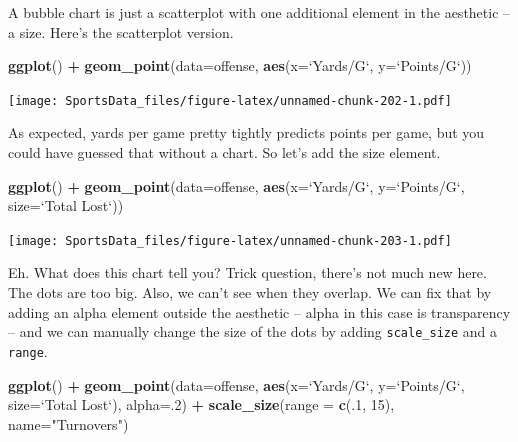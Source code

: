 \documentclass[]{book}
\newenvironment{Shaded}{\begin{snugshade}}{\end{snugshade}}
\newcommand{\DataTypeTok}[1]{\textcolor[rgb]{0.13,0.29,0.53}{#1}}
\newcommand{\DecValTok}[1]{\textcolor[rgb]{0.00,0.00,0.81}{#1}}
\newcommand{\KeywordTok}[1]{\textcolor[rgb]{0.13,0.29,0.53}{\textbf{#1}}}
\newcommand{\NormalTok}[1]{#1}
\newcommand{\OperatorTok}[1]{\textcolor[rgb]{0.81,0.36,0.00}{\textbf{#1}}}
\newcommand{\StringTok}[1]{\textcolor[rgb]{0.31,0.60,0.02}{#1}}
\begin{document}
A bubble chart is just a scatterplot with one additional element in the aesthetic -- a size. Here's the scatterplot version.

\begin{Shaded}
\begin{Highlighting}[]
\KeywordTok{ggplot}\NormalTok{() }\OperatorTok{+}\StringTok{ }\KeywordTok{geom_point}\NormalTok{(}\DataTypeTok{data=}\NormalTok{offense, }\KeywordTok{aes}\NormalTok{(}\DataTypeTok{x=}\StringTok{`}\DataTypeTok{Yards/G}\StringTok{`}\NormalTok{, }\DataTypeTok{y=}\StringTok{`}\DataTypeTok{Points/G}\StringTok{`}\NormalTok{))}
\end{Highlighting}
\end{Shaded}

\texttt{[image: SportsData\_files/figure-latex/unnamed-chunk-202-1.pdf]}

As expected, yards per game pretty tightly predicts points per game, but you could have guessed that without a chart. So let's add the size element.

\begin{Shaded}
\begin{Highlighting}[]
\KeywordTok{ggplot}\NormalTok{() }\OperatorTok{+}\StringTok{ }\KeywordTok{geom_point}\NormalTok{(}\DataTypeTok{data=}\NormalTok{offense, }\KeywordTok{aes}\NormalTok{(}\DataTypeTok{x=}\StringTok{`}\DataTypeTok{Yards/G}\StringTok{`}\NormalTok{, }\DataTypeTok{y=}\StringTok{`}\DataTypeTok{Points/G}\StringTok{`}\NormalTok{, }\DataTypeTok{size=}\StringTok{`}\DataTypeTok{Total Lost}\StringTok{`}\NormalTok{)) }
\end{Highlighting}
\end{Shaded}

\texttt{[image: SportsData\_files/figure-latex/unnamed-chunk-203-1.pdf]}

Eh. What does this chart tell you? Trick question, there's not much new here. The dots are too big. Also, we can't see when they overlap. We can fix that by adding an alpha element outside the aesthetic -- alpha in this case is transparency -- and we can manually change the size of the dots by adding \texttt{scale\_size} and a \texttt{range}.

\begin{Shaded}
\begin{Highlighting}[]
\KeywordTok{ggplot}\NormalTok{() }\OperatorTok{+}\StringTok{ }\KeywordTok{geom_point}\NormalTok{(}\DataTypeTok{data=}\NormalTok{offense, }\KeywordTok{aes}\NormalTok{(}\DataTypeTok{x=}\StringTok{`}\DataTypeTok{Yards/G}\StringTok{`}\NormalTok{, }\DataTypeTok{y=}\StringTok{`}\DataTypeTok{Points/G}\StringTok{`}\NormalTok{, }\DataTypeTok{size=}\StringTok{`}\DataTypeTok{Total Lost}\StringTok{`}\NormalTok{), }\DataTypeTok{alpha=}\NormalTok{.}\DecValTok{2}\NormalTok{) }\OperatorTok{+}\StringTok{ }\KeywordTok{scale_size}\NormalTok{(}\DataTypeTok{range =} \KeywordTok{c}\NormalTok{(.}\DecValTok{1}\NormalTok{, }\DecValTok{15}\NormalTok{), }\DataTypeTok{name=}\StringTok{"Turnovers"}\NormalTok{)}
\end{Highlighting}
\end{Shaded}
\end{document}
